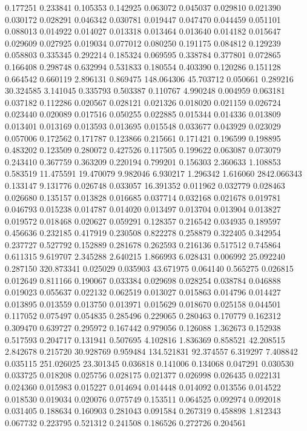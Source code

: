 0.177251
0.233841
0.105353
0.142925
0.063072
0.045037
0.029810
0.021390
0.030172
0.028291
0.046342
0.030781
0.019447
0.047470
0.044459
0.051101
0.088013
0.014922
0.014027
0.013318
0.013464
0.013640
0.014182
0.015647
0.029609
0.027925
0.019034
0.077012
0.080250
0.191175
0.084812
0.129239
0.058803
0.335345
0.292214
0.185324
0.069595
0.338784
0.377801
0.072865
0.166408
0.298748
0.632994
0.531833
0.180554
0.403390
0.120286
0.151128
0.664542
0.660119
2.896131
0.869475
148.064306
45.703712
0.050661
0.289216
30.324585
3.141045
0.335793
0.503387
0.110767
4.990248
0.004959
0.063181
0.037182
0.112286
0.020567
0.028121
0.021326
0.018020
0.021159
0.026724
0.023440
0.020089
0.017516
0.050255
0.022885
0.015344
0.014336
0.013809
0.013401
0.013169
0.013593
0.013695
0.015548
0.033677
0.043929
0.023029
0.057006
0.172562
0.171787
0.123866
0.215661
0.171421
0.196599
0.198895
0.483202
0.123509
0.280072
0.427526
0.117505
0.199622
0.063087
0.073079
0.243410
0.367759
0.363209
0.220194
0.799201
0.156303
2.360633
1.108853
0.583519
11.475591
19.470079
9.982046
6.930217
1.296342
1.616060
2842.066343
0.133147
9.131776
0.026748
0.033057
16.391352
0.011962
0.032779
0.028463
0.026680
0.135157
0.013828
0.016685
0.037714
0.032168
0.021678
0.019781
0.046793
0.015238
0.014787
0.014020
0.013497
0.013704
0.013904
0.013827
0.019572
0.018468
0.020627
0.059291
0.128357
0.216542
0.034935
0.189597
0.456636
0.232185
0.417919
0.230508
0.822278
0.258879
0.322405
0.342954
0.237727
0.527792
0.152889
0.281678
0.262593
0.216136
0.517512
0.745864
0.611315
9.619707
2.345288
2.640215
1.866993
6.028431
0.006992
25.092240
0.287150
320.873341
0.025029
0.035903
43.671975
0.064140
0.565275
0.026815
0.012649
0.811166
0.190067
0.033384
0.029698
0.028254
0.038784
0.046888
0.019023
0.055637
0.022132
0.062519
0.013027
0.015863
0.014796
0.014427
0.013895
0.013559
0.013750
0.013971
0.015629
0.018670
0.025158
0.044501
0.117052
0.075497
0.054835
0.285496
0.229065
0.280463
0.170779
0.162312
0.309470
0.639727
0.295972
0.167442
0.979056
0.126088
1.362673
0.152938
0.517593
0.204717
0.131941
0.507695
4.102816
1.836369
0.858521
42.208515
2.842678
0.215720
30.928769
0.959484
134.521831
92.374557
6.319297
7.408842
0.035115
251.026025
23.301345
0.036818
0.141006
0.134068
0.047291
0.030530
0.033725
0.018208
0.025756
0.028175
0.021377
0.026998
0.026435
0.022131
0.024360
0.015983
0.015227
0.014694
0.014448
0.014092
0.013556
0.014522
0.018530
0.019034
0.020076
0.075749
0.153511
0.064525
0.092974
0.092018
0.031405
0.188634
0.160903
0.281043
0.091584
0.267319
0.458898
1.812343
0.067732
0.223795
0.521312
0.241508
0.186526
0.272726
0.204561
